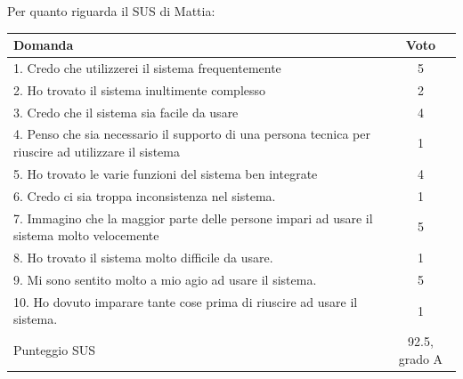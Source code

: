 \documentclass[../Report.tex]{subfiles}
\begin{document}
    Per quanto riguarda il SUS di Mattia:
    \begin{table}[H]
        \begin{tabular}{|p{10cm}|c|}
            \hline
            \textbf{Domanda} & \textbf{Voto}\\
            \hline
            1. \cellcolor{green} Credo che utilizzerei il sistema frequentemente & 5\\
            \hline
            2. \cellcolor{red} Ho trovato il sistema inultimente complesso & 2 \\
            \hline
            3. \cellcolor{green} Credo che il sistema sia facile da usare & 4 \\
            \hline
            4. \cellcolor{red} Penso che sia necessario il supporto di una persona tecnica per riuscire ad utilizzare il sistema & 1 \\
            \hline
            5. \cellcolor{green} Ho trovato le varie funzioni del sistema ben integrate & 4 \\
            \hline
            6. \cellcolor{red} Credo ci sia troppa inconsistenza nel sistema. & 1\\
            \hline
            7. \cellcolor{green} Immagino che la maggior parte delle persone impari ad usare il sistema molto velocemente & 5 \\
            \hline
            8. \cellcolor{red} Ho trovato il sistema molto difficile da usare. & 1 \\
            \hline
            9. \cellcolor{green} Mi sono sentito molto a mio agio ad usare il sistema. & 5\\
            \hline
            10. \cellcolor{red} Ho dovuto imparare tante cose prima di riuscire ad usare il sistema. & 1 \\ 
            \hline
            Punteggio SUS & 92.5, grado A \\
            \hline
        \end{tabular}
    \end{table}
\end{document}
